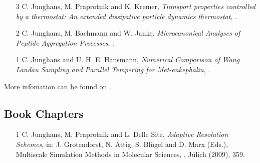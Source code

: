 \documentclass{article}
\begin{document}
\begin{enumerate}
\item[3] C. Junghans, M. Praprotnik and K. Kremer,
  \textit{Transport properties controlled by a thermostat: An extended dissipative particle dynamics thermostat},
  .

\item[2] C. Junghans, M. Bachmann and W. Janke,
  \textit{Microcanonical Analyses of Peptide Aggregation Processes},
  .

\item[1] C. Junghans and U. H. E. Hansmann,
  \textit{Numerical Comparison of Wang Landau Sampling and Parallel Tempering for Met-enkephalin}, 
  .
\end{enumerate}

More infomation can be found on .

\subsection*{Book Chapters}

\begin{enumerate}
\item[1] C. Junghans, M. Praprotnik and L. Delle Site,
  \textit{Adaptive Resolution Schemes},
  in: J. Grotendorst, N. Attig, S. Bl{\"u}gel and D. Marx (Eds.),
  Multiscale Simulation Methods in Molecular Sciences, , J{\"u}lich (2009), 359.
\end{enumerate}
\end{document}
